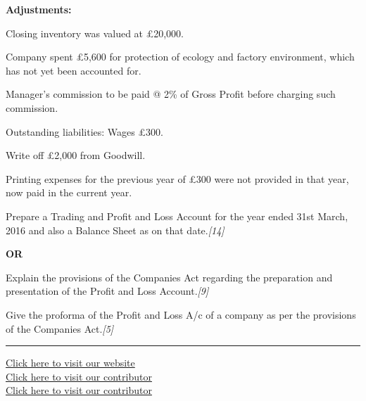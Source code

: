 \documentclass[11pt,a4paper]{article}
\newcommand{\pts}[1]{\hfill   \textit{[#1]}}
\begin{document}
\noindent   \textbf{Adjustments:}

\begin{parts}
  \item Closing inventory was valued at \pounds 20,000.
  \item Company spent \pounds 5,600 for protection of ecology and factory environment, which has not yet been accounted for.
  \item Manager's commission to be paid @ 2\% of Gross Profit before charging such commission.
  \item Outstanding liabilities: Wages \pounds 300.
  \item Write off \pounds 2,000 from Goodwill.
  \item Printing expenses for the previous year of \pounds 300 were not provided in that year, now paid in the current year.
\end{parts}
Prepare a Trading and Profit and Loss Account for the year ended 31st March, 2016 and also a Balance Sheet as on that date.\pts{14}

\centerline{   \textbf{OR}}


\begin{parts}
  \item Explain the provisions of the Companies Act regarding the preparation and presentation of the Profit and Loss Account.\pts{9}
  \item Give the proforma of the Profit and Loss A/c of a company as per the provisions of the Companies Act.\pts{5}
\end{parts}

\vfill
\rule{\linewidth}{0.4pt}

\begin{center}\small
\href{https://bhu-exam.vercel.app/}{Click here to visit our website}\\[4pt]
\href{https://me-aryan.vercel.app/}{Click here to visit our contributor}\\[4pt]
\href{https://quashan-me.vercel.app/}{Click here to visit our contributor}
\end{center}
\end{document}
